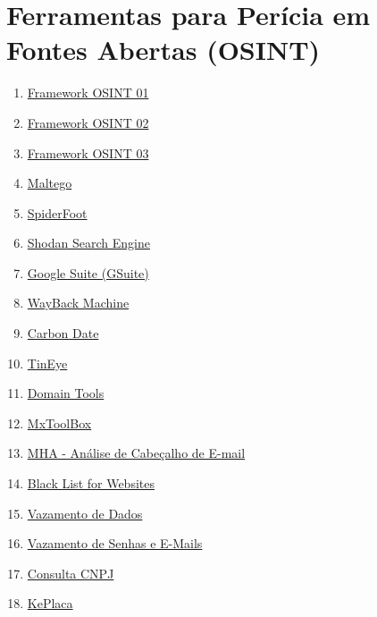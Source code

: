 \documentclass{article}
\begin{document}
\section{Ferramentas para Perícia em Fontes Abertas (OSINT)}
\begin{enumerate}
\item \href{https://www.advisor-bm.com/osint-tools}{Framework OSINT 01}
\item \href{https://osintframework.com/}{Framework OSINT 02}
\item \href{https://start.me/p/9Epj7a/osint}{Framework OSINT 03}
\item \href{https://www.maltego.com/downloads/}{Maltego}
\item \href{https://github.com/smicallef/spiderfoot}{SpiderFoot}
\item \href{https://www.shodan.io/}{Shodan Search Engine}
\item \href{https://gsuite.tools/pt}{Google Suite (GSuite)}
\item \href{http://web.archive.org/web/sitemap}{WayBack Machine}
\item \href{https://carbondate.cs.odu.edu/}{Carbon Date}
\item \href{https://tineye.com/}{TinEye}
\item \href{https://www.domaintools.com/}{Domain Tools}
\item \href{https://mxtoolbox.com/SuperTool.aspx}{MxToolBox}
\item \href{https://mha.azurewebsites.net/}{MHA - Análise de Cabeçalho de E-mail}
\item \href{https://sistemas.procon.sp.gov.br/evitesite/list/evitesites.php}{Black List for Websites}
\item \href{https://haveibeenpwned.com/}{Vazamento de Dados}
\item \href{https://pastebin.com/}{Vazamento de Senhas e E-Mails}
\item \href{http://servicos.receita.fazenda.gov.br/Servicos/cnpjreva/Cnpjreva_Solicitacao.asp}{Consulta CNPJ}
\item \href{https://www.keplaca.com/}{KePlaca}
\end{enumerate}
\end{document}
